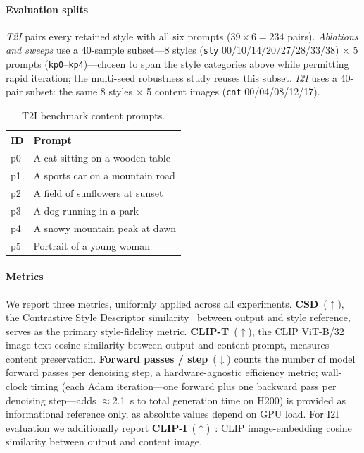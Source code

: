 \paragraph{Evaluation splits}
\emph{T2I} pairs every retained style with all six prompts
($39 \times 6 = 234$ pairs). \emph{Ablations and sweeps} use a 40-sample
subset---8 styles (\texttt{sty} 00/10/14/20/27/28/33/38) $\times$ 5 prompts
(\texttt{kp0}--\texttt{kp4})---chosen to span the style categories above while
permitting rapid iteration; the multi-seed robustness study reuses this subset.
\emph{I2I} uses a 40-pair subset: the same 8 styles $\times$ 5 content images
(\texttt{cnt} 00/04/08/12/17).

\begin{table}[h]
  \centering
  \caption{T2I benchmark content prompts.}
  \label{tab:prompts}
  \small
  \begin{tabular}{ll}
    \toprule
    ID & Prompt \\
    \midrule
    p0 & A cat sitting on a wooden table \\
    p1 & A sports car on a mountain road \\
    p2 & A field of sunflowers at sunset \\
    p3 & A dog running in a park \\
    p4 & A snowy mountain peak at dawn \\
    p5 & Portrait of a young woman \\
    \bottomrule
  \end{tabular}
\end{table}

\paragraph{Metrics}
We report three metrics, uniformly applied across all experiments.
\textbf{CSD}~($\uparrow$), the Contrastive Style Descriptor
similarity~\cite{somepalli2024measuring} between output and style reference,
serves as the primary style-fidelity metric.
\textbf{CLIP-T}~($\uparrow$), the CLIP ViT-B/32~\cite{radford2021learning}
image-text cosine similarity between output and content prompt,
measures content preservation.
\textbf{Forward passes / step}~($\downarrow$) counts the number of model forward
passes per denoising step, a hardware-agnostic efficiency metric; wall-clock
timing (each Adam iteration—one forward plus one backward pass per denoising
step—adds $\approx$2.1~s to total generation time on H200) is provided as
informational reference only, as absolute values depend on GPU load.
For I2I evaluation we additionally report \textbf{CLIP-I}~($\uparrow$)~\cite{radford2021learning}:
CLIP image-embedding cosine similarity between output and content image.

